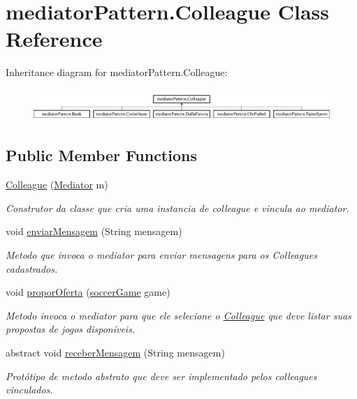 \hypertarget{classmediator_pattern_1_1_colleague}{}\section{mediator\+Pattern.\+Colleague Class Reference}
\label{classmediator_pattern_1_1_colleague}
Inheritance diagram for mediator\+Pattern.\+Colleague\+:\begin{figure}[H]
\begin{center}
\leavevmode
\includegraphics[height=1.230769cm]{classmediator_pattern_1_1_colleague}
\end{center}
\end{figure}
\subsection*{Public Member Functions}
\begin{DoxyCompactItemize}
\item 
\mbox{\hyperlink{classmediator_pattern_1_1_colleague_aa6743736562c0696099805ce69329856}{Colleague}} (\mbox{\hyperlink{interfacemediator_pattern_1_1_mediator}{Mediator}} m)
\begin{DoxyCompactList}\small\item\em Construtor da classe que cria uma instancia de colleague e vincula ao mediator. \end{DoxyCompactList}\item 
void \mbox{\hyperlink{classmediator_pattern_1_1_colleague_ab5fad1a9bc7ea337570d9da6f795731f}{enviar\+Mensagem}} (String mensagem)
\begin{DoxyCompactList}\small\item\em Metodo que invoca o mediator para enviar mensagens para os Colleagues cadastrados. \end{DoxyCompactList}\item 
void \mbox{\hyperlink{classmediator_pattern_1_1_colleague_ae661501777728adf280e9c5b447d99a2}{propor\+Oferta}} (\mbox{\hyperlink{classtemplate_pattern_1_1soccer_game}{soccer\+Game}} game)
\begin{DoxyCompactList}\small\item\em Metodo invoca o mediator para que ele selecione o \mbox{\hyperlink{classmediator_pattern_1_1_colleague}{Colleague}} que deve listar suas propostas de jogos disponíveis. \end{DoxyCompactList}\item 
abstract void \mbox{\hyperlink{classmediator_pattern_1_1_colleague_ad18791118d9a9897252bc68f4a7ee045}{receber\+Mensagem}} (String mensagem)
\begin{DoxyCompactList}\small\item\em Protótipo de metodo abstrato que deve ser implementado pelos colleagues vinculados. \end{DoxyCompactList}\end{DoxyCompactItemize}
